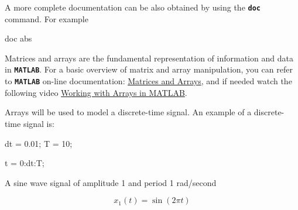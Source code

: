\documentclass{article}
\begin{document}
\begin{par}
\begin{flushleft}
A more complete documentation can be also obtained by using the \texttt{\textbf{doc}} command. For example
\end{flushleft}
\end{par}

\begin{matlabcode}
doc abs
\end{matlabcode}



\begin{par}
\begin{flushleft}
Matrices and arrays are the fundamental representation of information and data in \texttt{\textbf{MATLAB}}. For a basic overview of matrix and array manipulation, you can refer to \texttt{\textbf{MATLAB}} on-line documentation: \href{https://www.mathworks.com/help/matlab/learn_matlab/matrices-and-arrays.html}{Matrices and Arrays}, and if needed watch the following video \href{https://www.mathworks.com/videos/working-with-arrays-in-matlab-101637.html}{Working with Arrays in MATLAB}.
\end{flushleft}
\end{par}

\begin{par}
\begin{flushleft}
Arrays will be used to model a discrete-time signal. An example of a discrete-time signal is:
\end{flushleft}
\end{par}

\begin{matlabcode}
dt = 0.01; %
T = 10; %

t = 0:dt:T; %
\end{matlabcode}


\begin{par}
\begin{flushleft}
A sine wave signal of amplitude 1 and period 1 rad/second
\end{flushleft}
\end{par}

\begin{par}
$$x_1 (t)=\sin (2\pi t)$$
\end{par}
\end{document}
